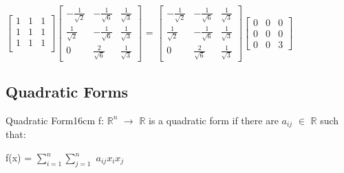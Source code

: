\begin{tbox}
        \hspace{0.5cm}
        \scriptsize
        $\begin{bmatrix}
            1 & 1 & 1 \\
            1 & 1 & 1 \\
            1 & 1 & 1 \\
        \end{bmatrix}
        \begin{bmatrix}
            -\frac{1}{\sqrt{2}} & -\frac{1}{\sqrt{6}} & \frac{1}{\sqrt{3}} \\
            \frac{1}{\sqrt{2}} & -\frac{1}{\sqrt{6}} & \frac{1}{\sqrt{3}} \\
            0 & \frac{2}{\sqrt{6}} & \frac{1}{\sqrt{3}}
        \end{bmatrix}$ =
        $\begin{bmatrix}
            -\frac{1}{\sqrt{2}} & -\frac{1}{\sqrt{6}} & \frac{1}{\sqrt{3}} \\
            \frac{1}{\sqrt{2}} & -\frac{1}{\sqrt{6}} & \frac{1}{\sqrt{3}} \\
            0 & \frac{2}{\sqrt{6}} & \frac{1}{\sqrt{3}}
        \end{bmatrix}
        \begin{bmatrix}
            0 & 0 & 0 \\
            0 & 0 & 0 \\
            0 & 0 & 3
        \end{bmatrix}$
        \normalsize
    \end{tbox}

    \newpage





\subsection{ Quadratic Forms }

    \begin{definition}{Quadratic Form}{16cm}
        f: $\mathbb{R}^n$ $\rightarrow$ $\mathbb{R}$
        is a {\color{lblue} quadratic form} if there are
        $a_{ij}$ $\in$ $\mathbb{R}$ such that:

        \hspace{0.5cm}
        f(x) = $\sum_{i=1}^n \sum_{j=1}^n$ $a_{ij}x_ix_j$
    \end{definition}

    \vspace{0.5cm}



